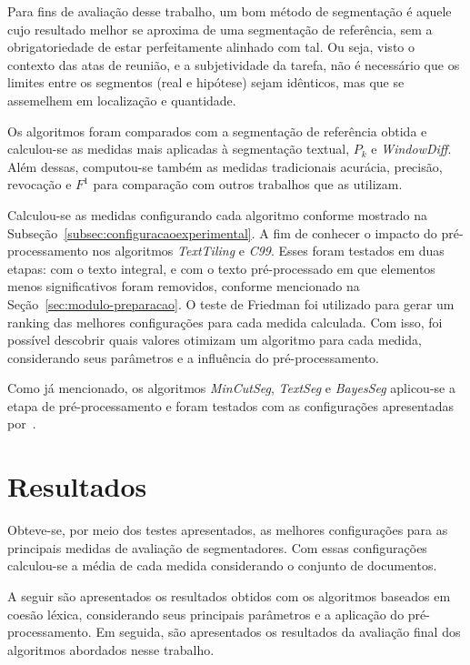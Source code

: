 Para fins de avaliação desse trabalho, um bom método de segmentação é aquele cujo resultado melhor se aproxima de uma segmentação de referência, sem a obrigatoriedade de estar perfeitamente alinhado com tal. Ou seja, visto o contexto das atas de reunião, e a subjetividade da tarefa, não é necessário que os limites entre os segmentos (real e hipótese) sejam idênticos, mas que se assemelhem em localização e quantidade.

Os algoritmos foram comparados com a segmentação de referência obtida e calculou-se as medidas mais aplicadas à segmentação textual, $P_k$ e \textit{WindowDiff}. Além dessas, computou-se também as medidas tradicionais acurácia, precisão, revocação e $F^1$ para comparação com outros trabalhos que as utilizam.

Calculou-se as medidas configurando cada algoritmo conforme mostrado na Subseção~\ref{subsec:configuracaoexperimental}.  
A fim de conhecer o impacto do pré-processamento nos algoritmos \textit{TextTiling} e \textit{C99}. Esses foram testados em duas etapas: com o texto integral, e com o texto pré-processado em que elementos menos significativos foram removidos, conforme mencionado na Seção~\ref{sec:modulo-preparacao}.  
O teste de Friedman foi utilizado para gerar um ranking das melhores configurações para cada medida calculada. Com isso, foi possível descobrir quais valores otimizam um algoritmo para cada medida, considerando seus parâmetros e a influência do pré-processamento. 
 
Como já mencionado, os algoritmos \textit{MinCutSeg}, \textit{TextSeg} e \textit{BayesSeg} aplicou-se a etapa de pré-processamento e foram testados com as configurações apresentadas por~\cite{Eisenstein2008}. 










\section{Resultados}


Obteve-se, por meio dos testes apresentados, as melhores configurações para as principais medidas de avaliação de segmentadores. Com essas configurações calculou-se a média de cada medida considerando o conjunto de documentos. 


A seguir são apresentados os resultados obtidos com os algoritmos baseados em coesão léxica, considerando seus principais parâmetros e a aplicação do pré-processamento. Em seguida, são apresentados os resultados da avaliação final dos algoritmos abordados nesse trabalho.


